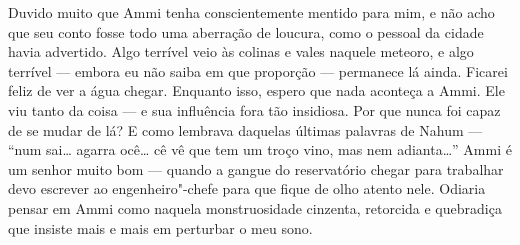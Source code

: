Duvido muito que Ammi tenha conscientemente mentido para mim, e não acho
que seu conto fosse todo uma aberração de loucura, como o pessoal da
cidade havia advertido. Algo terrível veio às colinas e vales naquele
meteoro, e algo terrível --- embora eu não saiba em que proporção ---
permanece lá ainda. Ficarei feliz de ver a água chegar. Enquanto isso,
espero que nada aconteça a Ammi. Ele viu tanto da
coisa --- e sua influência fora
tão insidiosa. Por que nunca foi capaz de se mudar de lá? E como
lembrava daquelas últimas palavras de Nahum --- ``num sai\ldots{} agarra
ocê\ldots{} cê vê que tem um troço vino, mas nem adianta\ldots{}'' Ammi é um
senhor muito bom --- quando a gangue do reservatório chegar para
trabalhar devo escrever ao engenheiro"-chefe para que fique de olho
atento nele. Odiaria pensar em Ammi como naquela monstruosidade
cinzenta, retorcida e quebradiça que insiste mais e mais em perturbar o
meu sono.
